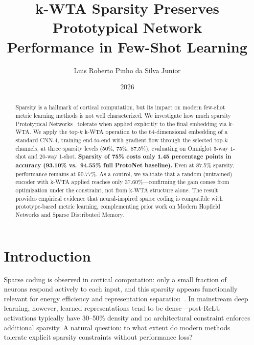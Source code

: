 \documentclass[11pt]{article}
\title{k-WTA Sparsity Preserves Prototypical Network\\Performance in Few-Shot Learning}
\author[1]{Luis Roberto Pinho da Silva Junior}
\affil[1]{Independent research \\ \url{https://github.com/luisroberto0/project-hebb}}
\date{2026}
\begin{document}
\maketitle

\begin{abstract}
Sparsity is a hallmark of cortical computation, but its impact on modern few-shot metric learning methods is not well characterized. We investigate how much sparsity Prototypical Networks~\citep{snell2017prototypical} tolerate when applied explicitly to the final embedding via k-WTA. We apply the top-$k$ k-WTA operation to the 64-dimensional embedding of a standard CNN-4, training end-to-end with gradient flow through the selected top-$k$ channels, at three sparsity levels (50\%, 75\%, 87.5\%), evaluating on Omniglot 5-way 1-shot and 20-way 1-shot. \textbf{Sparsity of 75\% costs only 1.45 percentage points in accuracy (93.10\% vs.\ 94.55\% full ProtoNet baseline).} Even at 87.5\% sparsity, performance remains at 90.77\%. As a control, we validate that a random (untrained) encoder with k-WTA applied reaches only 37.60\%---confirming the gain comes from optimization under the constraint, not from k-WTA structure alone. The result provides empirical evidence that neural-inspired sparse coding is compatible with prototype-based metric learning, complementing prior work on Modern Hopfield Networks and Sparse Distributed Memory.
\end{abstract}

\section{Introduction}

Sparse coding is observed in cortical computation: only a small fraction of neurons respond actively to each input, and this sparsity appears functionally relevant for energy efficiency and representation separation~\citep{olshausen1996emergence,ahmad2019dense}. In mainstream deep learning, however, learned representations tend to be dense---post-ReLU activations typically have 30--50\% density and no architectural constraint enforces additional sparsity. A natural question: to what extent do modern methods tolerate explicit sparsity constraints without performance loss?
\end{document}

